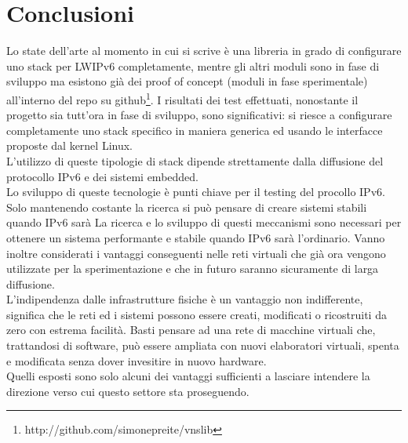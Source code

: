 
\chapter*{Conclusioni}
Lo state dell'arte al momento in cui si scrive \`e una libreria in grado di configurare uno stack per LWIPv6 completamente, mentre gli altri moduli sono in fase di sviluppo ma esistono gi\`a dei proof of concept (moduli in fase sperimentale) all'interno del repo su github\footnote{http://github.com/simonepreite/vnslib}.
I risultati dei test effettuati, nonostante il progetto sia tutt'ora in fase di sviluppo, sono significativi: si riesce a configurare completamente uno stack specifico in maniera generica ed usando le interfacce proposte dal kernel Linux.\\
L'utilizzo di queste tipologie di stack dipende strettamente dalla diffusione del protocollo IPv6 e dei sistemi embedded.\\
Lo sviluppo di queste tecnologie \`e punti chiave per il testing del procollo IPv6. Solo mantenendo costante la ricerca si pu\`o pensare di creare sistemi stabili quando IPv6 sar\`a
La ricerca e lo sviluppo di questi meccanismi sono necessari per ottenere un sistema performante e stabile quando IPv6 sar\`a l'ordinario. Vanno inoltre considerati i vantaggi conseguenti nelle reti virtuali che gi\`a ora vengono utilizzate per la sperimentazione e che in futuro saranno sicuramente di larga diffusione.\\
L'indipendenza dalle infrastrutture fisiche \`e un vantaggio non indifferente, significa che le reti ed i sistemi possono essere creati, modificati o ricostruiti da zero con estrema facilit\`a. Basti pensare ad una rete di macchine virtuali che, trattandosi di software, pu\`o essere ampliata con nuovi elaboratori virtuali, spenta e modificata senza dover invesitire in nuovo hardware.\\
Quelli esposti sono solo alcuni dei vantaggi sufficienti a lasciare intendere la direzione verso cui questo settore sta proseguendo.
